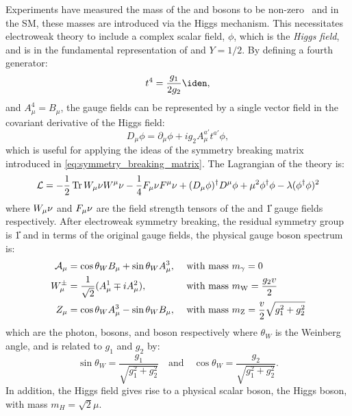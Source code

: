 Experiments have measured the mass of the \PW and \PZ bosons to be non-zero~\cite{ParticleDataGroup:2020ssz} and in the SM, these masses are introduced via the Higgs mechanism. This necessitates electroweak theory to include a complex scalar field, $\phi$, which is the \textit{Higgs field}, and is in the fundamental representation of  and $Y = 1/2$. By defining a fourth generator:
\begin{equation}
  t^4 = \frac{g_1}{2g_2} \iden,
\end{equation}
and $A_\mu^4 = B_\mu$, the gauge fields can be represented by a single vector field in the covariant derivative of the Higgs field:
\begin{equation}
  D_\mu \phi = \partial_\mu \phi + i g_2 A_\mu^{a'} t^{a'} \phi,
\end{equation}
which is useful for applying the ideas of the symmetry breaking matrix introduced in \cref{eq:symmetry_breaking_matrix}. The Lagrangian of the theory is:
\begin{equation}
  \mathcal{L} = -\frac{1}{2} \operatorname{Tr} W_\mu\nu W^\mu\nu - \frac{1}{4} F_\mu\nu F^\mu\nu + (D_\mu \phi)^\dag D^\mu \phi + \mu^2 \phi^\dag \phi - \lambda (\phi^\dag \phi)^2 
  \label{eq:electroweak_gauge_terms}
\end{equation}
where $W_\mu\nu$ and $F_\mu\nu$ are the field strength tensors of the  and \U{1} gauge fields respectively. After electroweak symmetry breaking, the residual symmetry group is \U{1} and in terms of the original gauge fields, the physical gauge boson spectrum is:
\begin{align}
  \mathcal{A}_\mu &= \cos{\theta_W} B_\mu + \sin{\theta_W} A^3_\mu, &&\text{ with mass } m_\gamma = 0 \\
  W_\mu^\pm &= \frac{1}{\sqrt{2}} (A^1_\mu \mp i A^2_\mu), &&\text{ with mass } m_\mathrm{W} = \frac{g_2 v}{2} \\
  Z_\mu &= \cos{\theta_W} A^3_\mu - \sin{\theta_W} B_\mu, &&\text{ with mass } m_\mathrm{Z} = \frac{v}{2} \sqrt{g_1^2 + g_2^2 } 
\end{align}
which are the photon, \PWpm bosons, and \PZ boson respectively where $\theta_W$ is the Weinberg angle, and is related to $g_1$ and $g_2$ by:
\begin{equation}
  \sin{\theta_W} = \frac{g_1}{\sqrt{g_1^2 + g_2^2 }}\quad \text{and} \quad \cos{\theta_W} = \frac{g_2}{\sqrt{g_1^2 + g_2^2}} .
\end{equation}
In addition, the Higgs field gives rise to a physical scalar boson, the Higgs boson, with mass ${m_H = \sqrt{2} \mu}$. 

